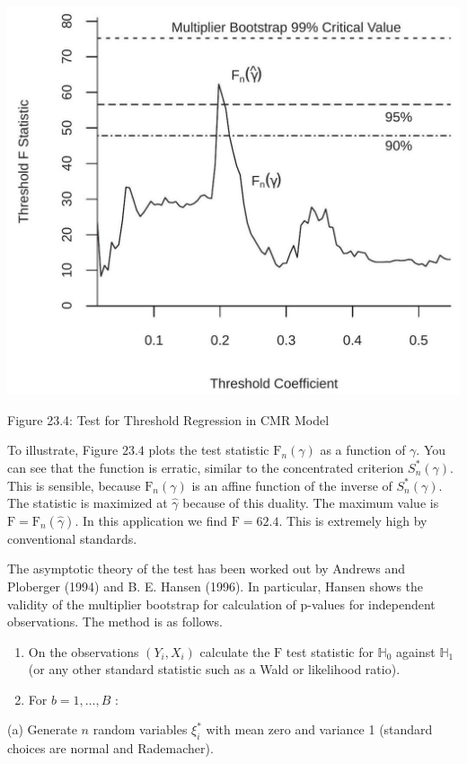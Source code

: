\documentclass[10pt]{article}
\begin{document}
\includegraphics[max width=\textwidth]{2022_10_23_afe6a5896d8677a5cd30g-14}

Figure 23.4: Test for Threshold Regression in CMR Model

To illustrate, Figure $23.4$ plots the test statistic $\mathrm{F}_{n}(\gamma)$ as a function of $\gamma$. You can see that the function is erratic, similar to the concentrated criterion $S_{n}^{*}(\gamma)$. This is sensible, because $\mathrm{F}_{n}(\gamma)$ is an affine function of the inverse of $S_{n}^{*}(\gamma)$. The statistic is maximized at $\widehat{\gamma}$ because of this duality. The maximum value is $\mathrm{F}=\mathrm{F}_{n}(\hat{\gamma})$. In this application we find $\mathrm{F}=62.4$. This is extremely high by conventional standards.

The asymptotic theory of the test has been worked out by Andrews and Ploberger (1994) and B. E. Hansen (1996). In particular, Hansen shows the validity of the multiplier bootstrap for calculation of p-values for independent observations. The method is as follows.

\begin{enumerate}
  \item On the observations $\left(Y_{i}, X_{i}\right)$ calculate the $\mathrm{F}$ test statistic for $\mathbb{H}_{0}$ against $\mathbb{H}_{1}$ (or any other standard statistic such as a Wald or likelihood ratio).

  \item For $b=1, \ldots, B$ :

\end{enumerate}
(a) Generate $n$ random variables $\xi_{i}^{*}$ with mean zero and variance 1 (standard choices are normal and Rademacher).
\end{document}
